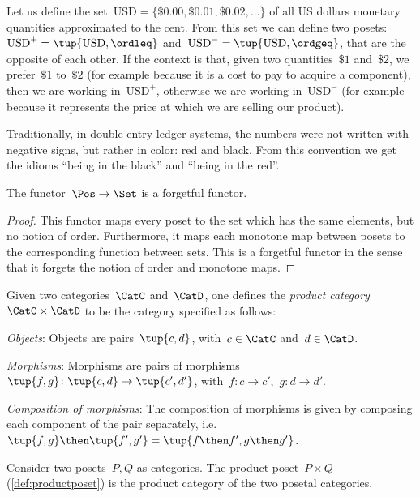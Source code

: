 \begin{example}
   Let us define the set~$\text{USD}=\{\$0.00,\$0.01,\$0.02,\dots\}$
   of all US dollars monetary quantities approximated to the cent.
   From this set we can define two posets:~$\text{USD}^{+} = \tup{\text{USD}, \ordleq}$ and~$\text{USD}^{-} = \tup{\text{USD}, \ordgeq}$, that are the opposite of each other.
   If the context is that, given two quantities~$\$1$ and~$\$2$, we prefer~$\$1$ to~$\$2$ (for example because it is a cost to pay to acquire a component), then we are working in~$\text{USD}^{+}$,
   otherwise we are working in~$\text{USD}^{-}$ (for example because it represents the price at which we are selling our product).

   Traditionally, in double-entry ledger systems, the numbers were not written with negative signs, but rather in color: red and black. From this convention we get the idioms ``being in the black'' and ``being in the red''.
\end{example}

\begin{lemma}
The functor~$\Pos \to \Set$ is a forgetful functor.
\end{lemma}
\begin{proof}
This functor maps every poset to the set which has the same elements, but no notion of order. Furthermore, it maps each monotone map between posets to the corresponding function between sets. This is a forgetful functor in the sense that it forgets the notion of order and monotone maps.
\end{proof}

\begin{shaded}
\begin{definition}
Given two categories~$\CatC$ and~$\CatD$, one defines the \emph{product category}~$\CatC \times \CatD$ to be the category specified as follows:
\begin{compactenum}
    \item \emph{Objects}: Objects are pairs~$\tup{c,d}$, with~$c\in \CatC$ and~$d\in \CatD$.
    \item \emph{Morphisms}: Morphisms are pairs of morphisms~$\tup{f,g}\colon \tup{c,d}\to \tup{c',d'}$, with~$f\colon c\to c'$,~$g\colon d\to d'$.
    \item \emph{Composition of morphisms}: The composition of morphisms is given by composing each component of the pair separately, i.e.~$\tup{f,g}\then \tup{f',g'}=\tup{f\then f',g\then g'}$. 
\end{compactenum}
\end{definition}
\end{shaded}
\begin{example}
Consider two posets~$P,Q$ as categories. The product poset~$P\times Q$ (\cref{def:productposet}) is the product category of the two posetal categories.
\end{example}

